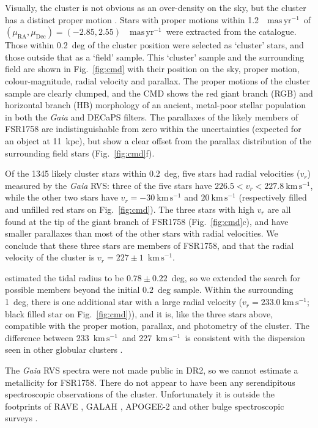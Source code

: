 \documentclass[fleqn,usenatbib,letters]{mnras}
\newcommand{\kms}{~\ensuremath{\textrm{km}\,\textrm{s}^{-1}}}
\newcommand{\masyr}{~\ensuremath{\textrm{mas}\,\textrm{yr}^{-1}}}
\begin{document}
Visually, the cluster is not obvious as an over-density on the sky, but the cluster has a distinct proper motion \citep{Cantat-Gaudin2018, Barba2018}. Stars with proper motions within 1.2~\masyr\ of $(\mu_\mathrm{RA},\mu_\mathrm{Dec})=(-2.85,2.55)$~\masyr\ were extracted from the catalogue. Those within 0.2~deg of the cluster position were selected as `cluster' stars, and those outside that as a `field' sample. This `cluster' sample and the surrounding field are shown in Fig.\ \ref{fig:cmd} with their position on the sky, proper motion, colour-magnitude, radial velocity and parallax. The proper motions of the cluster sample are clearly clumped, and the CMD shows the red giant branch (RGB) and horizontal branch (HB) morphology of an ancient, metal-poor stellar population in both the \textit{Gaia} and DECaPS filters. The parallaxes of the likely members of FSR1758 are indistinguishable from zero within the uncertainties (expected for an object at 11~kpc), but show a clear offset from the parallax distribution of the surrounding field stars (Fig.\ \ref{fig:cmd}f).

Of the 1345 likely cluster stars within 0.2~deg, five stars had radial velocities ($v_r$) measured by the \textit{Gaia} RVS: three of the five stars have $226.5<v_r<227.8\kms$, while the other two stars have $v_r=-30\kms$ and $20\kms$ (respectively filled and unfilled red stars on Fig.\ \ref{fig:cmd}). The three stars with high $v_r$ are all found at the tip of the giant branch of FSR1758 (Fig.\ \ref{fig:cmd}c), and have smaller parallaxes than most of the other stars with radial velocities. We conclude that these three stars are members of FSR1758, and that the radial velocity of the cluster is $v_r=227\pm1$\kms.

 estimated the tidal radius to be $0.78\pm0.22$~deg, so we extended the search for possible members beyond the initial $0.2$~deg sample. Within the surrounding 1~deg, there is one additional star with a large radial velocity ($v_r=233.0\kms$; black filled star on Fig.\ \ref{fig:cmd})), and it is, like the three stars above, compatible with the proper motion, parallax, and photometry of the cluster. The difference between 233\kms\ and 227\kms\ is consistent with the dispersion seen in other globular clusters \cite[e.g., $\omega$~Cen has a velocity dispersion of $\sim10\kms$;][]{Johnson:2010fs}.

The \textit{Gaia} RVS spectra were not made public in DR2, so we cannot estimate a metallicity for FSR1758. There do not appear to have been any serendipitous spectroscopic observations of the cluster. Unfortunately it is outside the footprints of RAVE \citep{Kunder:2017gp}, GALAH \citep{DeSilva:2015gr,Buder2018}, APOGEE-2 \citep{Zasowski:2017jy} and other bulge spectroscopic surveys \citep[e.g.,][]{Freeman2013,Zoccali2014,Howes:2016ji}.
\end{document}
